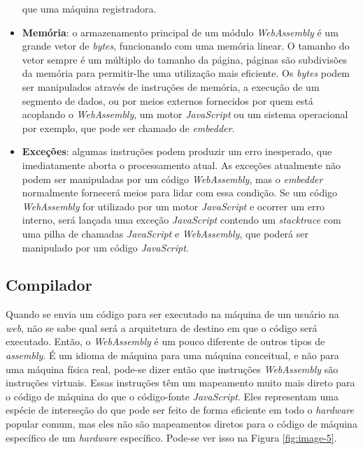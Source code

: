 \begin{itemize}
    que uma máquina registradora.
    \item \textbf{Memória}: o armazenamento principal de um módulo \textit{WebAssembly} é
    um grande vetor de \textit{bytes}, funcionando com uma memória linear. O tamanho do
    vetor sempre é um múltiplo do tamanho da página, páginas são subdivisões da memória
    para permitir-lhe uma utilização mais eficiente. Os \textit{bytes} podem ser
    manipulados através de instruções de memória, a execução de um segmento de dados, ou
    por meios externos fornecidos por quem está acoplando o \textit{WebAssembly}, um motor
    \textit{JavaScript} ou um sistema operacional por exemplo, que pode ser chamado de
    \textit{embedder}.
    \item \textbf{Exceções}: algumas instruções podem produzir um erro inesperado, que
    imediatamente aborta o processamento atual. As exceções atualmente não podem ser
    manipuladas por um código \textit{WebAssembly}, mas o \textit{embedder} normalmente
    fornecerá meios para lidar com essa condição. Se um código \textit{WebAssembly} for
    utilizado por um motor \textit{JavaScript} e ocorrer um erro interno, será lançada uma
    exceção \textit{JavaScript} contendo um \textit{stacktrace} com uma pilha de chamadas
    \textit{JavaScript} e \textit{WebAssembly}, que poderá ser manipulado por um código
    \textit{JavaScript}.
\end{itemize}

\subsection{Compilador}
\label{ssec:wa-compiler}

Quando se envia um código para ser executado na máquina de um usuário na \textit{web}, não
se sabe qual será a arquitetura de destino em que o código será executado. Então, o
\textit{WebAssembly} é um pouco diferente de outros tipos de \textit{assembly}. É um
idioma de máquina para uma máquina conceitual, e não para uma máquina física real, pode-se
dizer então que instruções \textit{WebAssembly} são instruções virtuais. Essas instruções
têm um mapeamento muito mais direto para o código de máquina do que o código-fonte
\textit{JavaScript}. Eles representam uma espécie de interseção do que pode ser feito de
forma eficiente em todo o \textit{hardware} popular comum, mas eles não são mapeamentos
diretos para o código de máquina específico de um \textit{hardware} específico. Pode-se
ver isso na Figura \ref{fig:image-5}.

